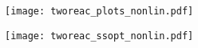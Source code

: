 \documentclass{article}
\begin{document}
\begin{figure}[!h]
  \centering
  \texttt{[image: tworeac\_plots\_nonlin.pdf]}
\end{figure}

\begin{figure}[!h]
  \centering
  \texttt{[image: tworeac\_ssopt\_nonlin.pdf]}
\end{figure}



\end{document}
